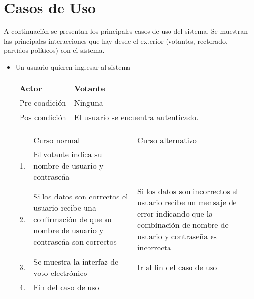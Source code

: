 \section{Casos de Uso}

A continuaci\'on se presentan los principales casos de uso del sistema.
Se muestran las principales interacciones que hay desde el exterior (votantes, rectorado, partidos pol\'iticos) con el sistema.

\begin{itemize}
\item Un usuario quieren ingresar al sistema
\begin{center}
\begin{tabular}{ll}
Actor & Votante \\
\hline
Pre condición & Ninguna \\
\hline
Pos condición & El usuario se encuentra autenticado. \\
\hline
\end{tabular}
\medskip
\begin{tabular}{c p{4cm}|p{4cm}}
 & Curso normal & Curso alternativo \\
 1. & El votante indica su nombre de usuario y contraseña &  \\
 2. & Si los datos son correctos el usuario recibe una confirmación de que su nombre de usuario y contraseña son correctos & Si los datos son incorrectos el usuario recibe un mensaje de error indicando que la combinación de nombre de usuario y contraseña es incorrecta \\
 3. & Se muestra la interfaz de voto electrónico & Ir al fin del caso de uso \\
4. & Fin del caso de uso& \\ 
\end{tabular}
\end{center}


\end{itemize}
